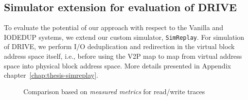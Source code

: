 \subsection{Simulator extension for evaluation of DRIVE}
To evaluate the potential of our approach with respect to the Vanilla
and IODEDUP systems, we extend our custom simulator, \texttt{SimReplay}.
For simulation of DRIVE, we perform I/O deduplication and redirection
in the virtual block address space itself, i.e., before using the V2P
map to map from virtual address space into physical block address space.
More details presented in Appendix chapter~\ref{chap:thesis-simreplay}.

\begin{figure}[t]
	 \hfill
	\caption{Comparison based on \textit{measured metrics} for read/write traces}
	\label{fig:eval-read-write-perf-a}
\end{figure}

